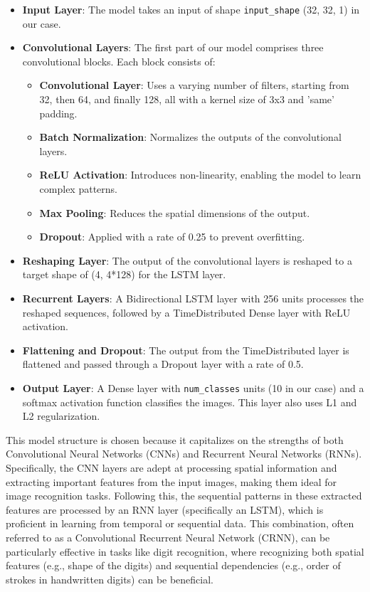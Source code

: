 \begin{itemize}
    \item \textbf{Input Layer}: The model takes an input of shape \texttt{input\_shape} (32, 32, 1) in our case.
    \item \textbf{Convolutional Layers}: The first part of our model comprises three convolutional blocks. Each block consists of:
          \begin{itemize}
              \item \textbf{Convolutional Layer}: Uses a varying number of filters, starting from 32, then 64, and finally 128, all with a kernel size of 3x3 and 'same' padding.
              \item \textbf{Batch Normalization}: Normalizes the outputs of the convolutional layers.
              \item \textbf{ReLU Activation}: Introduces non-linearity, enabling the model to learn complex patterns.
              \item \textbf{Max Pooling}: Reduces the spatial dimensions of the output.
              \item \textbf{Dropout}: Applied with a rate of 0.25 to prevent overfitting.
          \end{itemize}
    \item \textbf{Reshaping Layer}: The output of the convolutional layers is reshaped to a target shape of (4, 4*128) for the LSTM layer.
    \item \textbf{Recurrent Layers}: A Bidirectional LSTM layer with 256 units processes the reshaped sequences, followed by a TimeDistributed Dense layer with ReLU activation.
    \item \textbf{Flattening and Dropout}: The output from the TimeDistributed layer is flattened and passed through a Dropout layer with a rate of 0.5.
    \item \textbf{Output Layer}: A Dense layer with \texttt{num\_classes} units (10 in our case) and a softmax activation function classifies the images. This layer also uses L1 and L2 regularization.
\end{itemize}



This model structure is chosen because it capitalizes on the strengths of both Convolutional Neural Networks (CNNs) and Recurrent Neural Networks (RNNs). Specifically, the CNN layers are adept at processing spatial information and extracting important features from the input images, making them ideal for image recognition tasks. Following this, the sequential patterns in these extracted features are processed by an RNN layer (specifically an LSTM), which is proficient in learning from temporal or sequential data. This combination, often referred to as a Convolutional Recurrent Neural Network (CRNN), can be particularly effective in tasks like digit recognition, where recognizing both spatial features (e.g., shape of the digits) and sequential dependencies (e.g., order of strokes in handwritten digits) can be beneficial.

